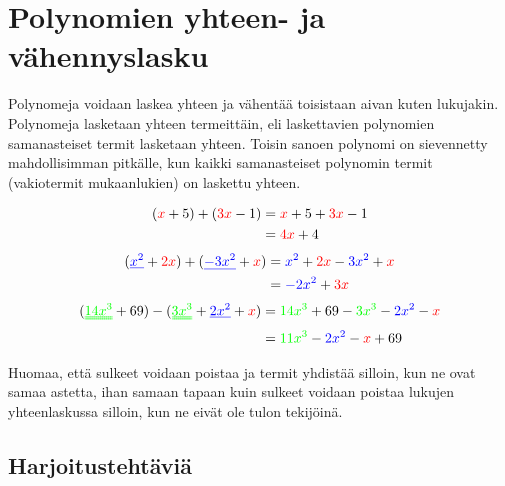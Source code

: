 \chapter{Polynomien yhteen- ja vähennyslasku}

Polynomeja voidaan laskea yhteen ja vähentää toisistaan aivan kuten lukujakin.
Polynomeja lasketaan yhteen termeittäin, eli laskettavien polynomien
samanasteiset termit lasketaan yhteen. Toisin sanoen polynomi on sievennetty
mahdollisimman pitkälle, kun kaikki samanasteiset polynomin termit
(vakiotermit mukaanlukien) on laskettu yhteen.

\begin{esimerkki}
    \begin{align*}
        (\textcolor{red}{x}+5) + (\textcolor{red}{3x}-1) &= \textcolor{red}{x} + 5 + 
        \textcolor{red}{3x} - 1 \\
        &= \textcolor{red}{4x} + 4
    \end{align*}
    \begin{align*}
        (\textcolor{blue}{\uline{x^2}} + \textcolor{red}{2x}) 
            + (\textcolor{blue}{\uline{-3x^2}} + \textcolor{red}{x}) 
        &= \textcolor{blue}{x^2} + \textcolor{red}{2x} - \textcolor{blue}{3x^2} 
            + \textcolor{red}{x} \\
        &= \textcolor{blue}{-2x^2} + \textcolor{red}{3x}
    \end{align*}
    \begin{align*}
        (\textcolor{green}{\uuline{14x^3}} + 69) - (\textcolor{green}{\uuline{3x^3}} + 
            \textcolor{blue}{\uline{2x^2}} + \textcolor{red}{x}) 
        &= \textcolor{green}{14x^3} + 69 - \textcolor{green}{3x^3} - 
            \textcolor{blue}{2x^2} - \textcolor{red}{x} \\
        &= \textcolor{green}{11x^3} - \textcolor{blue}{2x^2} - \textcolor{red}{x} + 69
    \end{align*}
\end{esimerkki}


Huomaa, että sulkeet voidaan poistaa ja termit yhdistää silloin, kun ne ovat
samaa astetta, ihan samaan tapaan kuin sulkeet voidaan poistaa lukujen
yhteenlaskussa silloin, kun ne eivät ole tulon tekijöinä.

\section{Harjoitustehtäviä}

